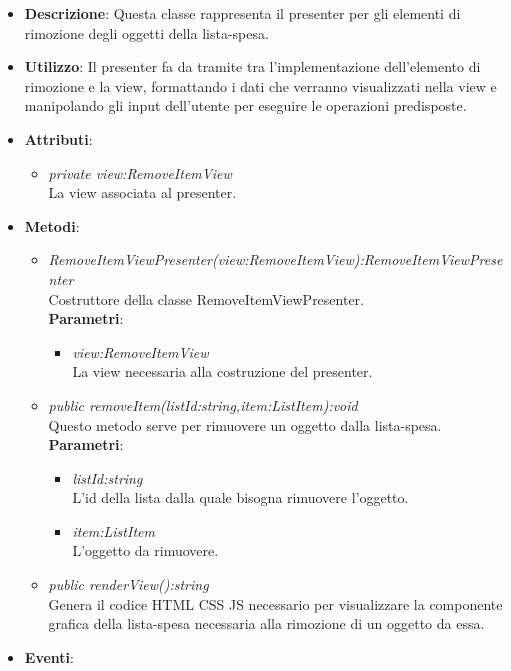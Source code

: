 \begin{itemize}
\item \textbf{Descrizione}: Questa classe rappresenta il presenter per gli elementi di rimozione degli oggetti  della lista-spesa.
\item \textbf{Utilizzo}: Il presenter fa da tramite tra l'implementazione dell'elemento di rimozione e la view, formattando i dati che verranno visualizzati nella view e manipolando gli input dell'utente per eseguire le operazioni predisposte.
\item \textbf{Attributi}: 
	\begin{itemize}
	\item \textit{private view:RemoveItemView}\\
	La view associata al presenter.
	\end{itemize}
\item \textbf{Metodi}:
	\begin{itemize}
	\item \textit{RemoveItemViewPresenter(view:RemoveItemView):RemoveItemViewPresenter}\\
	Costruttore della classe RemoveItemViewPresenter.
			\\ \textbf{Parametri}: \begin{itemize}
			\item \textit{view:RemoveItemView}\\
			La view necessaria alla costruzione del presenter.
			\end{itemize} 
	\item \textit{public removeItem(listId:string,item:ListItem):void}\\
	Questo metodo serve per rimuovere un oggetto dalla lista-spesa.
			\\ \textbf{Parametri}: \begin{itemize}
			\item \textit{listId:string}\\
			L'id della lista dalla quale bisogna rimuovere l'oggetto.
			\item \textit{item:ListItem}\\
			L'oggetto da rimuovere.
			\end{itemize} 
	\item \textit{public renderView():string}\\
	Genera il codice HTML CSS JS necessario per visualizzare la componente grafica della lista-spesa necessaria alla rimozione di un oggetto da essa.
	\end{itemize}
\item \textbf{Eventi}:
\end{itemize}

